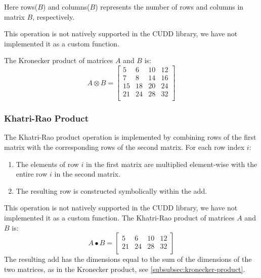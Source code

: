 Here rows($B$) and columns($B$) represents the number of rows and columns in matrix $B$, respectively.

This operation is not natively supported in the CUDD library, we have not implemented it as a custom function.

The Kronecker product of matrices $A$ and $B$ is:
\[
    A \otimes B = \begin{bmatrix}
        5  & 6  & 10 & 12 \\
        7  & 8  & 14 & 16 \\
        15 & 18 & 20 & 24 \\
        21 & 24 & 28 & 32 \\
    \end{bmatrix}
\]

\subsubsection{Khatri-Rao Product}
The Khatri-Rao product operation is implemented by combining rows of the first matrix with the corresponding rows of the second matrix. For each row index $i$:
\begin{enumerate}
    \item The elements of row $i$ in the first matrix are multiplied element-wise with the entire row $i$ in the second matrix.
    \item The resulting row is constructed symbolically within the \gls{add}.   
\end{enumerate}
This operation is not natively supported in the CUDD library, we have not implemented it as a custom function.
The Khatri-Rao product of matrices $A$ and $B$ is:
\[
    A \bullet B = \begin{bmatrix}
        5  & 6  & 10 & 12 \\
        21 & 24 & 28 & 32 \\
    \end{bmatrix}
\]
The resulting \gls{add} has the dimensions equal to the sum of the dimensions of the two matrices, as in the Kronecker product, see \autoref{subsubsec:kronecker-product}.
